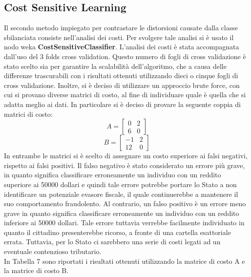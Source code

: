 \documentclass[fleqn,10pt]{SelfArx}
\begin{document}
\subsection{Cost Sensitive Learning}
Il secondo metodo impiegato per contrastare le distorsioni causate dalla classe sbilanciata consiste nell'analisi dei costi. Per svolgere tale analisi si è usato il nodo weka \textbf{CostSensitiveClassifier}. L'analisi dei costi è stata accompagnata dall'uso del 3 folds cross validation. Questo numero di fogli di cross validazione è stato scelto sia per garantire la scalabilità dell'algoritmo, che a causa delle differenze trascurabili con i risultati ottenuti utilizzando dieci o cinque fogli di cross validazione. Inoltre, si è deciso di utilizzare un approccio brute force, con cui si provano diverse matrici di costo, al fine di individuare quale è quella che si adatta meglio ai dati.
In particolare si è deciso di provare la seguente coppia di matrici di costo:
$$
A =
\begin{bmatrix}
 0 & 2 \\ 
 6 & 0
 \end{bmatrix}
 $$
 $$
 B =
\begin{bmatrix}
 -1 & 2 \\ 
 12 & 0
 \end{bmatrix}
$$
In entrambe le matrici si è scelto di assegnare un costo superiore ai falsi negativi, rispetto ai falsi positivi. Il falso negativo è stato considerato un errore più grave, in quanto significa classificare erroneamente un individuo con un reddito superiore ai \num{50000} dollari e quindi tale errore potrebbe portare lo Stato a non identificare un potenziale evasore fiscale, il quale continuerebbe a mantenere il suo comportamento fraudolento. Al contrario, un falso positivo è un errore meno grave in quanto significa classificare erroneamente un individuo con un reddito inferiore ai \num{50000} dollari. Tale errore tuttavia verrebbe facilmente individuato in quanto il cittadino presenterebbe ricorso, a fronte di una cartella esattoriale errata. Tuttavia, per lo Stato ci sarebbero una serie di costi legati ad un eventuale contenzioso tributario.\\
In Tabella 7 sono riportati i risultati ottenuti utilizzando la matrice di costo A e la matrice di costo B.
\end{document}
